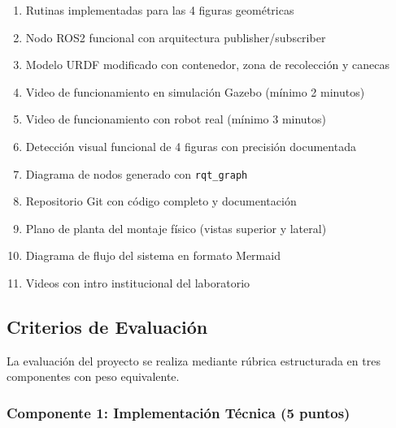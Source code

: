 \begin{enumerate}
    \item[$\square$] Rutinas implementadas para las 4 figuras geométricas
    \item[$\square$] Nodo ROS2 funcional con arquitectura publisher/subscriber
    \item[$\square$] Modelo URDF modificado con contenedor, zona de recolección y canecas
    \item[$\square$] Video de funcionamiento en simulación Gazebo (mínimo 2 minutos)
    \item[$\square$] Video de funcionamiento con robot real (mínimo 3 minutos)
    \item[$\square$] Detección visual funcional de 4 figuras con precisión documentada
    \item[$\square$] Diagrama de nodos generado con \texttt{rqt\_graph}
    \item[$\square$] Repositorio Git con código completo y documentación
    \item[$\square$] Plano de planta del montaje físico (vistas superior y lateral)
    \item[$\square$] Diagrama de flujo del sistema en formato Mermaid
    \item[$\square$] Videos con intro institucional del laboratorio
\end{enumerate}

\subsection{Criterios de Evaluación}

La evaluación del proyecto se realiza mediante rúbrica estructurada en tres componentes con peso equivalente.

\subsubsection{Componente 1: Implementación Técnica (5 puntos)}

